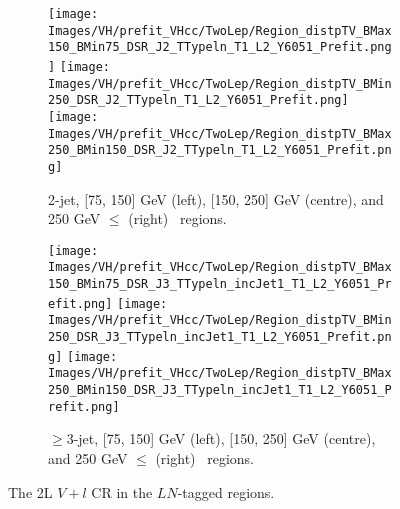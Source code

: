 \begin{figure}[h!]
    \centering
    \begin{subfigure}[b]{\textwidth}
        \centering
        \texttt{[image: Images/VH/prefit\_VHcc/TwoLep/Region\_distpTV\_BMax150\_BMin75\_DSR\_J2\_TTypeln\_T1\_L2\_Y6051\_Prefit.png]}
        \texttt{[image: Images/VH/prefit\_VHcc/TwoLep/Region\_distpTV\_BMin250\_DSR\_J2\_TTypeln\_T1\_L2\_Y6051\_Prefit.png]}
        \texttt{[image: Images/VH/prefit\_VHcc/TwoLep/Region\_distpTV\_BMax250\_BMin150\_DSR\_J2\_TTypeln\_T1\_L2\_Y6051\_Prefit.png]}
        \caption{2-jet, [75, 150] GeV (left), [150, 250] GeV (centre), and 250  GeV $\leq$ (right) \ptv\ regions.}
        \label{fig:plots_VHcc_2L_LN_2J}
    \end{subfigure}
    \begin{subfigure}[b]{\textwidth}
        \centering
        \texttt{[image: Images/VH/prefit\_VHcc/TwoLep/Region\_distpTV\_BMax150\_BMin75\_DSR\_J3\_TTypeln\_incJet1\_T1\_L2\_Y6051\_Prefit.png]}
        \texttt{[image: Images/VH/prefit\_VHcc/TwoLep/Region\_distpTV\_BMin250\_DSR\_J3\_TTypeln\_incJet1\_T1\_L2\_Y6051\_Prefit.png]}
        \texttt{[image: Images/VH/prefit\_VHcc/TwoLep/Region\_distpTV\_BMax250\_BMin150\_DSR\_J3\_TTypeln\_incJet1\_T1\_L2\_Y6051\_Prefit.png]}
        \caption{$\geq$3-jet, [75, 150] GeV (left), [150, 250] GeV (centre), and 250  GeV $\leq$ (right) \ptv\ regions.}
        \label{fig:plots_VHcc_2L_LN_3J}
    \end{subfigure}
    \caption{The 2L $V+l$ CR in the $LN$-tagged regions.}
    \label{fig:plots_VHcc_2L_LN}
\end{figure}

